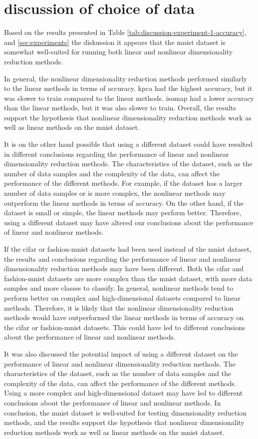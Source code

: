 \section{discussion of choice of data}
Based on the results presented in Table \ref{tab:discussion-experiment-1-accuracy}, and \ref{sec:experiments} the diskussion it appears that the \gls{mnist} dataset is somewhat well-suited for running both linear and nonlinear dimensionality reduction methods.  

In general, the nonlinear dimensionality reduction methods performed similarly to the linear methods in terms of accuracy. \gls{kpca} had the highest accuracy, but it was slower to train compared to the linear methods. \gls{isomap} had a lower accuracy than the linear methods, but it was also slower to train. Overall, the results support the hypothesis that nonlinear dimensionality reduction methods work as well as linear methods on the \gls{mnist} dataset.

It is on the other hand possible that using a different dataset could have resulted in different conclusions regarding the performance of linear and nonlinear dimensionality reduction methods. The characteristics of the dataset, such as the number of data samples and the complexity of the data, can affect the performance of the different methods. For example, if the dataset has a larger number of data samples or is more complex, the nonlinear methods may outperform the linear methods in terms of accuracy. On the other hand, if the dataset is small or simple, the linear methods may perform better. Therefore, using a different dataset may have altered our conclusions about the performance of linear and nonlinear methods.

If the \gls{cifar} or \gls{fashion-mnist} datasets had been used instead of the \gls{mnist} dataset, the results and conclusions regarding the performance of linear and nonlinear dimensionality reduction methods may have been different. Both the \gls{cifar} and \gls{fashion-mnist} datasets are more complex than the \gls{mnist} dataset, with more data samples and more classes to classify. In general, nonlinear methods tend to perform better on complex and high-dimensional datasets compared to linear methods. Therefore, it is likely that the nonlinear dimensionality reduction methods would have outperformed the linear methods in terms of accuracy on the \gls{cifar} or \gls{fashion-mnist} datasets. This could have led to different conclusions about the performance of linear and nonlinear methods.

It was also discussed the potential impact of using a different dataset on the performance of linear and nonlinear dimensionality reduction methods. The characteristics of the dataset, such as the number of data samples and the complexity of the data, can affect the performance of the different methods. Using a more complex and high-dimensional dataset may have led to different conclusions about the performance of linear and nonlinear methods. In conclusion, the \gls{mnist} dataset is well-suited for testing dimensionality reduction methods, and the results support the hypothesis that nonlinear dimensionality reduction methods work as well as linear methods on the \gls{mnist} dataset.
